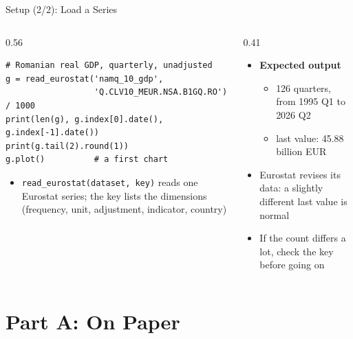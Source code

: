 \begin{frame}[fragile]{Setup (2/2): Load a Series}
\itemsize{\footnotesize}
\begin{columns}[T]
\begin{column}{0.56\textwidth}
\begin{lstlisting}
# Romanian real GDP, quarterly, unadjusted
g = read_eurostat('namq_10_gdp',
                  'Q.CLV10_MEUR.NSA.B1GQ.RO') / 1000
print(len(g), g.index[0].date(), g.index[-1].date())
print(g.tail(2).round(1))
g.plot()          # a first chart
\end{lstlisting}
\begin{itemize}
    \item \texttt{read\_eurostat(dataset, key)} reads one Eurostat series; the key lists the dimensions (frequency, unit, adjustment, indicator, country)
\end{itemize}
\end{column}
\begin{column}{0.41\textwidth}
\begin{itemize}
    \item \textbf{Expected output}
    \begin{itemize}
        \item 126 quarters, from 1995 Q1 to 2026 Q2
        \item last value: 45.88 billion EUR
    \end{itemize}
    \item Eurostat revises its data: a slightly different last value is normal
    \item If the count differs a lot, check the key before going on
\end{itemize}
\end{column}
\end{columns}
\end{frame}


\section{Part A: On Paper}

